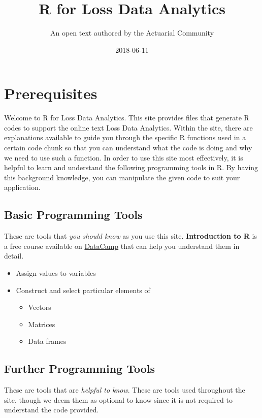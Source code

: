 \documentclass[]{book}
\title{R for Loss Data Analytics}
\author{An open text authored by the Actuarial Community}
\date{2018-06-11}
\providecommand{\tightlist}{%
  \setlength{\itemsep}{0pt}\setlength{\parskip}{0pt}}
\theoremstyle{definition}
\theoremstyle{definition}
\theoremstyle{definition}
\theoremstyle{remark}
\begin{document}
\maketitle

{
\setcounter{tocdepth}{1}
\tableofcontents
}
\chapter{Prerequisites}\label{prerequisites}

Welcome to R for Loss Data Analytics. This site provides files that
generate R codes to support the online text Loss Data Analytics. Within
the site, there are explanations available to guide you through the
specific R functions used in a certain code chunk so that you can
understand what the code is doing and why we need to use such a
function. In order to use this site most effectively, it is helpful to
learn and understand the following programming tools in R. By having
this background knowledge, you can manipulate the given code to suit
your application.

\section{Basic Programming Tools}\label{basic-programming-tools}

These are tools that \emph{you should know} as you use this site.
\textbf{Introduction to R} is a free course available on
\href{https://www.datacamp.com/}{DataCamp} that can help you understand
them in detail.

\begin{itemize}
\tightlist
\item
  Assign values to variables
\item
  Construct and select particular elements of

  \begin{itemize}
  \tightlist
  \item
    Vectors
  \item
    Matrices
  \item
    Data frames
  \end{itemize}
\end{itemize}

\section{Further Programming Tools}\label{further-programming-tools}

These are tools that are \emph{helpful to know}. These are tools used
throughout the site, though we deem them as optional to know since it is
not required to understand the code provided.
\end{document}
